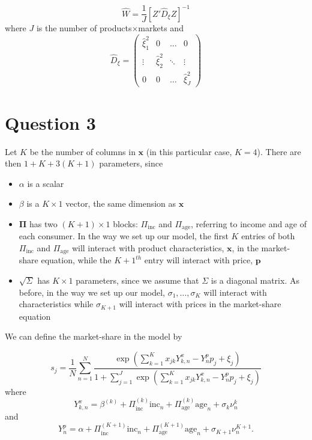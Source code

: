 \documentclass[a4paper,11pt]{article}
\begin{document}
\[\hat W = \frac{1}{J}\left[Z'\hat{D}_{\xi}Z\right]^{-1} \]where $J$ is the number of products$\times$markets and 
\[ \hat{D}_{\xi} = \left(\begin{array}{cccc}
\hat\xi_1^2 & 0 & \ldots & 0 \\
\vdots & \hat\xi_2^2 & \ddots & \vdots \\
0 & 0 & \ldots & \hat\xi_J^2
\end{array} \right) \]


\section*{Question 3}
Let $K$ be the number of columns in $\mathbf{x}$ (in this particular case, $K = 4$). There are then $1 + K + 3(K+1)$ parameters, since
\begin{itemize}
\item $\alpha$ is a scalar
\item $\beta$ is a $K \times 1$ vector, the same dimension as $\mathbf{x}$
\item $\mathbf{\Pi}$ has two $(K+1) \times 1$ blocks: $\Pi_{\mathrm{inc}}$ and $\Pi_{\mathrm{age}}$, referring to income and age of each consumer. In the way we set up our model, the first $K$ entries of both $\Pi_{\mathrm{inc}}$ and $\Pi_{\mathrm{age}}$ will interact with product characteristics, $\mathbf{x}$, in the market-share equation, while the $K+1^{th}$ entry will interact with price, $\mathbf{p}$
\item $\sqrt{\Sigma}$ has $K\times 1$ parameters, since we assume that $\Sigma$ is a diagonal matrix. As before, in the way we set up our model, $\sigma_{1}, \ldots, \sigma_{K}$ will interact with characteristics while $\sigma_{K+1}$ will interact with prices in the market-share equation
\end{itemize}

We can define the market-share in the model by

\[ s_j = \frac{1}{N}\sum_{n=1}^N \frac{\exp\left(\sum_{k=1}^K
x_{jk}Y^x_{k,n} - Y^p_{n}p_j + \xi_j \right)}{ 1 + \sum_{j = 1}^J\exp\left(\sum_{k=1}^K x_{jk}Y^x_{k,n} - Y^p_{n}p_j + \xi_j \right)} \]
where
\[ Y^x_{k,n} = \beta^{(k)} + \Pi_{\mathrm{inc}}^{(k)}\mathrm{inc}_n + \Pi_{\mathrm{age}}^{(k)}\mathrm{age}_n + \sigma_k \nu_n^k\]
and
\[ Y^p_{n} = \alpha + \Pi_{\mathrm{inc}}^{(K+1)}\mathrm{inc}_n + \Pi_{\mathrm{age}}^{(K+1)}\mathrm{age}_n + \sigma_{K+1}\nu_n^{K+1}. \]
\end{document}
